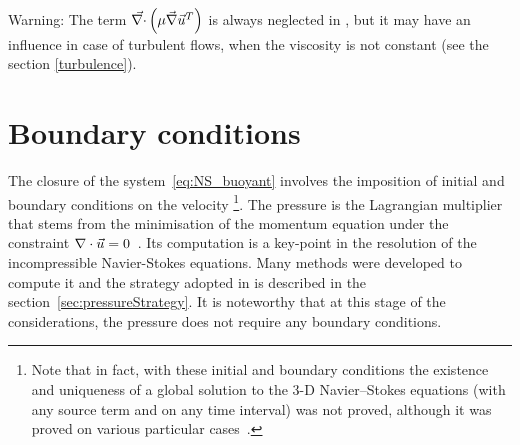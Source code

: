 \begin{WarningBlock}{Warning:}
  The term $\vec{\nabla \cdot} \left(\mu \vec \nabla \vec{u}^T\right)$ is always neglected in , but it may have an
  influence in case of turbulent flows, when the viscosity is not constant (see the section \ref{turbulence}).
\end{WarningBlock}

%
%



\section{Boundary conditions}
The closure of the system~\eqref{eq:NS_buoyant} involves the imposition of initial and boundary conditions on the velocity%
\footnote{Note that in fact, with these initial and boundary conditions the existence and uniqueness of a global solution
  to the 3-D Navier--Stokes equations (with any source term and on any time interval)
  was not proved, although it was proved on various particular cases~\cite{Lions1996}.}.
The pressure is the Lagrangian multiplier that stems from the minimisation of the momentum equation
under the constraint \mbox{$\nabla \cdot \vec{u} = 0$}~\cite{Aris1962}.
Its computation is a key-point in the resolution of the incompressible Navier-Stokes equations.
Many methods were developed to compute it and the strategy adopted in  is described in the
section~\ref{sec:pressureStrategy}.
It is noteworthy that at this stage of the considerations, the pressure does not require any boundary conditions.

